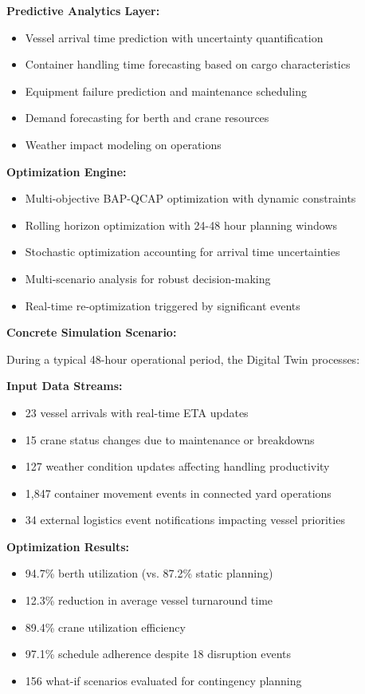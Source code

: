 \documentclass{article}
\begin{document}
\textbf{Predictive Analytics Layer:}
\begin{itemize}
\item Vessel arrival time prediction with uncertainty quantification
\item Container handling time forecasting based on cargo characteristics
\item Equipment failure prediction and maintenance scheduling
\item Demand forecasting for berth and crane resources
\item Weather impact modeling on operations
\end{itemize}

\textbf{Optimization Engine:}
\begin{itemize}
\item Multi-objective BAP-QCAP optimization with dynamic constraints
\item Rolling horizon optimization with 24-48 hour planning windows
\item Stochastic optimization accounting for arrival time uncertainties
\item Multi-scenario analysis for robust decision-making
\item Real-time re-optimization triggered by significant events
\end{itemize}

\textbf{Concrete Simulation Scenario:}

During a typical 48-hour operational period, the Digital Twin processes:

\textbf{Input Data Streams:}
\begin{itemize}
\item 23 vessel arrivals with real-time ETA updates
\item 15 crane status changes due to maintenance or breakdowns
\item 127 weather condition updates affecting handling productivity
\item 1,847 container movement events in connected yard operations
\item 34 external logistics event notifications impacting vessel priorities
\end{itemize}

\textbf{Optimization Results:}
\begin{itemize}
\item 94.7\% berth utilization (vs. 87.2\% static planning)
\item 12.3\% reduction in average vessel turnaround time
\item 89.4\% crane utilization efficiency
\item 97.1\% schedule adherence despite 18 disruption events
\item 156 what-if scenarios evaluated for contingency planning
\end{itemize}
\end{document}
